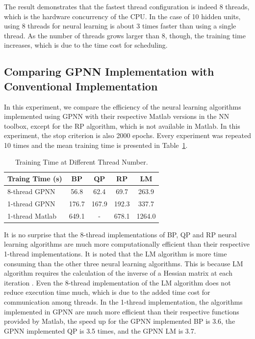 \documentclass[procedia]{easychair}
\begin{document}
The result demonstrates that the fastest thread configuration is indeed 8 threads, which is the hardware concurrency of the CPU.  In the case of 10 hidden units, using 8 threads for neural learning is about 3 times faster than using a single thread.  As the number of threads grows larger than 8, though, the training time increases, which is due to the time cost for scheduling.

\subsection{Comparing GPNN Implementation with Conventional Implementation}

In this experiment, we compare the efficiency of the neural learning algorithms implemented using GPNN with their respective Matlab versions in the NN toolbox, except for the RP algorithm, which is not available in Matlab.  In this experiment, the stop criterion is also 2000 epochs.  Every experiment was repeated 10 times and the mean training time is presented in Table~\ref{table:algorithm_complexity}.

\begin{table}[htp]
    \centering
    \caption{Training Time at Different Thread Number.}
    \begin{tabular}{ l c c c c }
        \hline \hline
        Traing Time (s) & BP & QP & RP & LM \\
        \hline
        8-thread GPNN & 56.8 & 62.4 & 69.7 & 263.9 \\
        1-thread GPNN & 176.7 & 167.9 & 192.3 & 337.7 \\
        1-thread Matlab & 649.1 & - & 678.1 & 1264.0 \\
        \hline \hline
    \end{tabular}
    \label{table:algorithm_complexity}
\end{table}

It is no surprise that the 8-thread implementations of BP, QP and RP neural learning algorithms are much more computationally efficient than their respective 1-thread implementations.  It is noted that the LM algorithm is more time consuming than the other three neural learning algorithms.  This is because LM algorithm requires the calculation of the inverse of a Hessian matrix at each iteration \cite{yu2011levenberg}.  Even the 8-thread implementation of the LM algorithm does not reduce execution time much, which is due to the added time cost for communication among threads.  In the 1-thread implementation, the algorithms implemented in GPNN are much more efficient than their respective functions provided by Matlab, the speed up for the GPNN implemented BP is 3.6, the GPNN implemented QP is 3.5 times, and the GPNN LM is 3.7.
\end{document}
